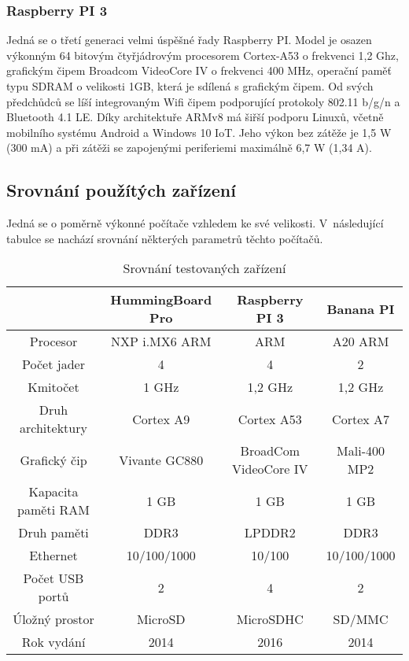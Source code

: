 \subsubsection*{Raspberry PI 3}
Jedná se o třetí generaci velmi úspěšné řady Raspberry PI. Model je osazen výkonným 64 bitovým čtyřjádrovým procesorem Cortex-A53 o frekvenci 1,2 Ghz, grafickým čipem Broadcom VideoCore IV o frekvenci 400 MHz, operační paměť typu SDRAM o velikosti 1GB, která je sdílená s grafickým čipem. Od svých předchůdců se líší integrovaným Wifi čipem podporující protokoly 802.11 b/g/n a Bluetooth 4.1 LE. Díky architektuře ARMv8 má šiřší podporu Linuxů, včetně mobilního systému Android a Windows 10 IoT. Jeho výkon bez zátěže je 1,5 W (300 mA) a při zátěži se zapojenými periferiemi maximálně 6,7 W (1,34 A).

\subsection{Srovnání použítých zařízení}
Jedná se o poměrně výkonné počítače vzhledem ke své velikosti. V~následující tabulce se nachází srovnání některých parametrů těchto počítačů.
\begin{table}[H]
\centering
\caption{Srovnání testovaných zařízení}
\begin{tabular} { |c|c|c|c| }
\hline
{}                  & {HummingBoard Pro}    & {Raspberry PI 3}      & {Banana PI}          \\ \hline
Procesor            & NXP i.MX6 ARM         & ARM                   & A20 ARM              \\ \hline
Počet jader         & 4                     & 4                     & 2                    \\ \hline
Kmitočet            & 1 GHz                 & 1,2 GHz               & 1,2 GHz              \\ \hline
Druh architektury   & Cortex A9             & Cortex A53            & Cortex A7            \\ \hline
Grafický čip        & Vivante GC880         & BroadCom VideoCore IV & Mali-400 MP2         \\ \hline
Kapacita paměti RAM & 1 GB                  & 1 GB                  & 1 GB                 \\ \hline
Druh paměti         & DDR3                  & LPDDR2                & DDR3                 \\ \hline
Ethernet            & 10/100/1000           & 10/100                & 10/100/1000          \\ \hline
Počet USB portů     & 2                     & 4                     & 2                    \\ \hline
Úložný prostor      & MicroSD               & MicroSDHC             & SD/MMC               \\ \hline
Rok vydání          & 2014                  & 2016                  & 2014                 \\ \hline
\end{tabular}
\label{srovnaniPC}
\end{table}
